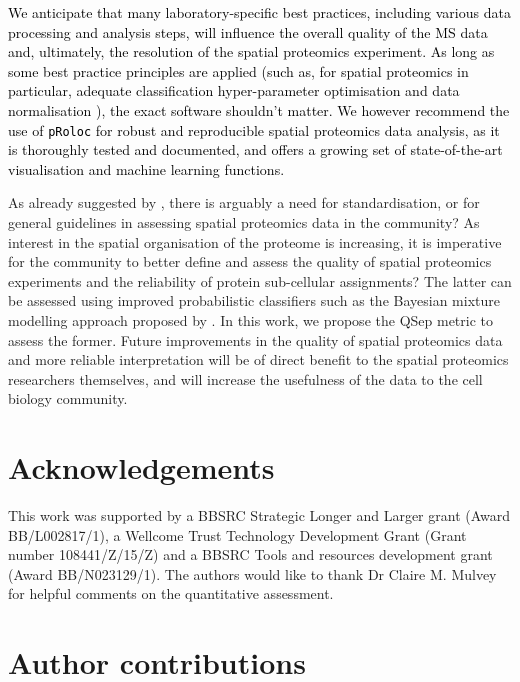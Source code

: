 \documentclass[12pt]{article}\usepackage[]{graphicx}\usepackage[]{color}
\begin{document}
\textcolor{black}{We anticipate that many laboratory-specific best
  practices, including various data processing and analysis steps,
  will influence the overall quality of the MS data and, ultimately,
  the resolution of the spatial proteomics experiment. As long as some
  best practice principles are applied (such as, for spatial
  proteomics in particular, adequate classification hyper-parameter
  optimisation and data normalisation \cite{Gatto:2014}), the exact
  software shouldn't matter. We however recommend the use of
  \texttt{pRoloc} \cite{Gatto:2014a} for robust and reproducible
  spatial proteomics data analysis, as it is thoroughly tested and
  documented, and offers a growing set of state-of-the-art
  visualisation and machine learning functions.}

\bigskip


As already suggested by \citet{Lund-Johansen:2016}, there is arguably
a need for standardisation, or for general guidelines in assessing
spatial proteomics data in the community? As interest in the spatial
organisation of the proteome is increasing, it is imperative for the
community to better define and assess the quality of spatial
proteomics experiments and the reliability of protein sub-cellular
assignments? The latter can be assessed using improved probabilistic
classifiers such as the Bayesian mixture modelling approach proposed
by \citet{Crook:2018}. In this work, we propose the QSep metric to
assess the former. Future improvements in the quality of spatial
proteomics data and more reliable interpretation will be of direct
benefit to the spatial proteomics researchers themselves, and will
increase the usefulness of the data to the cell biology community.

\clearpage

\section*{Acknowledgements}

This work was supported by a BBSRC Strategic Longer and Larger grant
(Award BB/L002817/1), a Wellcome Trust Technology Development Grant
(Grant number 108441/Z/15/Z) and a BBSRC Tools and resources
development grant (Award BB/N023129/1). The authors would like to
thank Dr Claire M. Mulvey for helpful comments on the quantitative
assessment.

\section*{Author contributions}
\end{document}
